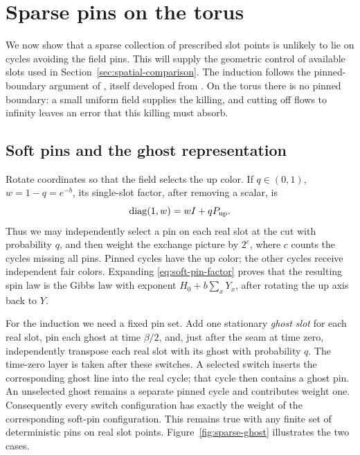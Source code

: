 \section{Sparse pins on the torus}\label{sec:sparse-pins}

We now show that a sparse collection of prescribed slot points is
unlikely to lie on cycles avoiding the field pins.  This will supply
the geometric control of available slots used in
Section~\ref{sec:spatial-comparison}.  The induction follows the
pinned-boundary argument of \cite[Section~4]{BL}, itself developed from
\cite[Sections~5 and~7]{Ord}.  On the torus there is no pinned boundary:
a small uniform field supplies the killing, and cutting off flows to
infinity leaves an error that this killing must absorb.

\subsection{Soft pins and the ghost representation}

Rotate coordinates so that the field selects the up color.  If
\(q\in(0,1)\), \(w=1-q=e^{-b}\), its single-slot factor, after
removing a scalar, is
\begin{equation}\label{eq:soft-pin-factor}
 \operatorname{diag}(1,w)=wI+qP_{\mathrm{up}}.
\end{equation}
Thus we may independently select a pin on each real slot at the cut
with probability \(q\), and then weight the exchange picture by
\(2^{c}\), where \(c\) counts the cycles missing all pins.  Pinned
cycles have the up color; the other cycles receive independent fair
colors.  Expanding \eqref{eq:soft-pin-factor} proves that the resulting
spin law is the Gibbs law with exponent \(H_0+b\sum_xY_x\), after
rotating the up axis back to \(Y\).

For the induction we need a fixed pin set.  Add one stationary
\emph{ghost slot} for each real slot, pin each ghost at time
\(\beta/2\), and, just after the seam at time zero, independently
transpose each real slot with its ghost with probability \(q\).
The time-zero layer is taken after these switches.  A selected switch
inserts the corresponding ghost line into the real cycle; that cycle
then contains a ghost pin.  An unselected ghost remains a separate
pinned cycle and contributes weight one.  Consequently every switch
configuration has exactly the weight of the corresponding soft-pin
configuration.  This remains true with any finite set of deterministic
pins on real slot points.  Figure~\ref{fig:sparse-ghost} illustrates
the two cases.

